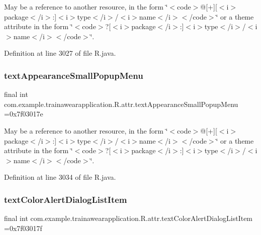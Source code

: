 May be a reference to another resource, in the form \char`\"{}$<$code$>$@\mbox{[}+\mbox{]}\mbox{[}$<$i$>$package$<$/i$>$\+:\mbox{]}$<$i$>$type$<$/i$>$/$<$i$>$name$<$/i$>$$<$/code$>$\char`\"{} or a theme attribute in the form \char`\"{}$<$code$>$?\mbox{[}$<$i$>$package$<$/i$>$\+:\mbox{]}$<$i$>$type$<$/i$>$/$<$i$>$name$<$/i$>$$<$/code$>$\char`\"{}. 

Definition at line 3027 of file R.\+java.

\mbox{\label{classcom_1_1example_1_1trainawearapplication_1_1_r_1_1attr_aca400d7ce7275da2f7cb6cd18040d351}} 
\subsubsection{\texorpdfstring{textAppearanceSmallPopupMenu}{textAppearanceSmallPopupMenu}}
{\footnotesize\ttfamily final int com.\+example.\+trainawearapplication.\+R.\+attr.\+text\+Appearance\+Small\+Popup\+Menu =0x7f03017e\hspace{0.3cm}{\ttfamily [static]}}

May be a reference to another resource, in the form \char`\"{}$<$code$>$@\mbox{[}+\mbox{]}\mbox{[}$<$i$>$package$<$/i$>$\+:\mbox{]}$<$i$>$type$<$/i$>$/$<$i$>$name$<$/i$>$$<$/code$>$\char`\"{} or a theme attribute in the form \char`\"{}$<$code$>$?\mbox{[}$<$i$>$package$<$/i$>$\+:\mbox{]}$<$i$>$type$<$/i$>$/$<$i$>$name$<$/i$>$$<$/code$>$\char`\"{}. 

Definition at line 3034 of file R.\+java.

\mbox{\label{classcom_1_1example_1_1trainawearapplication_1_1_r_1_1attr_a5be0e14e8d88290050c3a42d716580b8}} 
\subsubsection{\texorpdfstring{textColorAlertDialogListItem}{textColorAlertDialogListItem}}
{\footnotesize\ttfamily final int com.\+example.\+trainawearapplication.\+R.\+attr.\+text\+Color\+Alert\+Dialog\+List\+Item =0x7f03017f\hspace{0.3cm}{\ttfamily [static]}}

